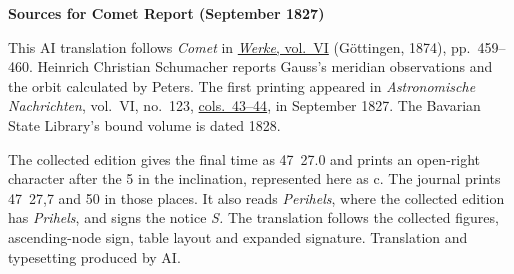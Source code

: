 \clearpage\thispagestyle{empty}
\begin{center}\textbf{Sources for Comet Report (September 1827)}\end{center}
\noindent This AI translation follows \textit{Comet} in \href{https://gdz.sub.uni-goettingen.de/id/PPN236007467}{\textit{Werke}, vol.~VI} (Göttingen, 1874), pp.~459--460. Heinrich Christian Schumacher reports Gauss’s meridian observations and the orbit calculated by Peters. The first printing appeared in \textit{Astronomische Nachrichten}, vol.~VI, no.~123, \href{https://api.digitale-sammlungen.de/iiif/image/v2/bsb10049431_00038/full/1550,/0/default.jpg}{cols.~43--44}, in September 1827. The Bavarian State Library’s bound volume is dated 1828.
\par\smallskip\noindent The collected edition gives the final time as 47~27.0 and prints an open-right character after the 5 in the inclination, represented here as \textup{c}. The journal prints 47~27,7 and 50 in those places. It also reads \textit{Perihels}, where the collected edition has \textit{Prihels}, and signs the notice \textit{S.} The translation follows the collected figures, ascending-node sign, table layout and expanded signature. Translation and typesetting produced by AI.
\clearpage
